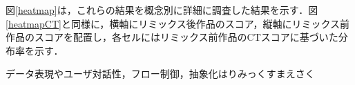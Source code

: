 \documentclass[submit,techrep,noauthor]{ipsj}
\newcommand{\memo}[1]{\colorbox{magenta!30}{\textbf{MEMO}}{\color{red!50}\textbf{[#1]}}}
\begin{document}


図\ref{heatmap}は，これらの結果を概念別に詳細に調査した結果を示す．図\ref{heatmapCT}と同様に，横軸にリミックス後作品のスコア，縦軸にリミックス前作品のスコアを配置し，各セルにはリミックス前作品のCTスコアに基づいた分布率を示す．

データ表現やユーザ対話性，フロー制御，抽象化はりみっくすまえさく







\end{document}
